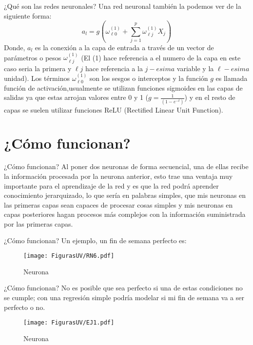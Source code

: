 \documentclass[10pt]{beamer}
\begin{document}
\begin{frame}{¿Qué son las redes neuronales?}
Una red neuronal también la podemos ver de la siguiente forma:
$$a_l=g(\omega_{\ell0}^{(1)}+\sum_{j=1}^{p} \omega_{\ell j}^{(1)}X_j)$$
Donde, $a_l$ es la conexión a la capa de entrada a través de un vector de parámetros o pesos $\omega_{\ell j}^{(1)}$ (El (1) hace referencia a el numero de la capa en este caso seria la primera y $\ell j$ hace referencia a la $j-esima$ variable y la $\ell-esima$ unidad). Los términos $\omega_{\ell0}^{(1)}$ son los sesgos o interceptos y la función $g$ es llamada función de activación,usualmente se utilizan funciones sigmoides en las capas de salidas ya que estas arrojan valores entre 0 y 1 ($g=\frac{1}{(1-e^{-t})}$) y en el resto de capas se suelen utilizar funciones ReLU (Rectified Linear Unit Function).

 
\end{frame}


\section{¿Cómo funcionan?}
\begin{frame}{¿Cómo funcionan?}
Al poner dos neuronas de forma secuencial, una de ellas recibe la información procesada por la neurona anterior, esto trae una ventaja muy importante para el aprendizaje
de la red y es que la red podrá aprender conocimiento jerarquizado, lo que sería en palabras simples,
que mis neuronas en las primeras capas sean capaces de procesar cosas simples y mis neuronas en
capas posteriores hagan procesos más complejos con la información suministrada por las primeras
capas.
\end{frame}

\begin{frame}{¿Cómo funcionan?}
Un ejemplo, un fin de semana perfecto es:

\begin{figure}[h!]
  \centering
  \texttt{[image: FigurasUV/RN6.pdf]}
  \caption{Neurona}
\end{figure}

\end{frame}

\begin{frame}{¿Cómo funcionan?}
No es posible que sea perfecto si una de estas condiciones no se cumple; con una regresión simple podría modelar si mi fin de semana va a ser perfecto o no.

\begin{figure}[h!]
  \centering
  \texttt{[image: FigurasUV/EJ1.pdf]}
  \caption{Neurona}
\end{figure}

\end{frame}
\end{document}
